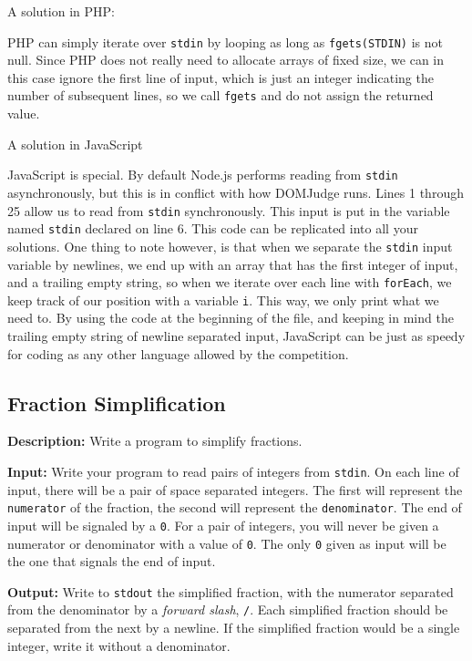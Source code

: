 \documentclass[a4paper]{article}
\begin{document}
A solution in PHP:

PHP can simply iterate over \texttt{stdin} by looping as long as \texttt{fgets(STDIN)} is not null. Since PHP does not really need to allocate arrays of fixed size, we can in this case ignore the first line of input, which is just an integer indicating the number of subsequent lines, so we call \texttt{fgets} and do not assign the returned value.
\newpage

A solution in JavaScript

JavaScript is special. By default Node.js performs reading from \texttt{stdin} asynchronously, but this is in conflict with how DOMJudge runs. Lines 1 through 25 allow us to read from \texttt{stdin} synchronously. This input is put in the variable named \texttt{stdin} declared on line 6. This code can be replicated into all your solutions. One thing to note however, is that when we separate the \texttt{stdin} input variable by newlines, we end up with an array that has the first integer of input, and a trailing empty string, so when we iterate over each line with \texttt{forEach}, we keep track of our position with a variable \texttt{i}. This way, we only print what we need to. By using the code at the beginning of the file, and keeping in mind the trailing empty string of newline separated input, JavaScript can be just as speedy for coding as any other language allowed by the competition. 
\newpage

\subsection{Fraction Simplification}
\textbf{Description:} Write a program to simplify fractions.

\textbf{Input:} Write your program to read pairs of integers from \texttt{stdin}. On each line of input, there will be a pair of space separated integers. The first will represent the \texttt{numerator} of the fraction, the second will represent the \texttt{denominator}. The end of input will be signaled by a \texttt{0}. For a pair of integers, you will never be given a numerator or denominator with a value of \texttt{0}. The only \texttt{0} given as input will be the one that signals the end of input. 


\textbf{Output:} Write to \texttt{stdout} the simplified fraction, with the numerator separated from the denominator by a \textit{forward slash}, \texttt{/}. Each simplified fraction should be separated from the next by a newline. If the simplified fraction would be a single integer, write it without a denominator.  
\end{document}
